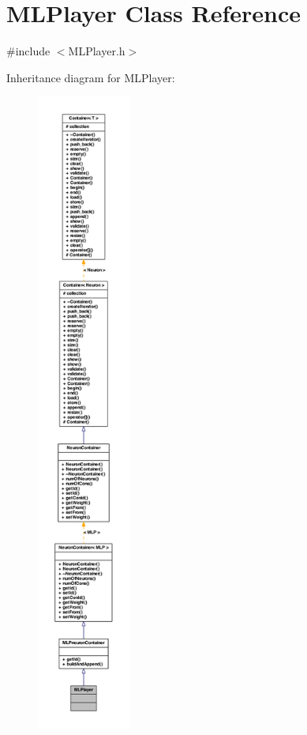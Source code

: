 \hypertarget{class_m_l_player}{
\section{MLPlayer Class Reference}
\label{class_m_l_player}
}


{\ttfamily \#include $<$MLPlayer.h$>$}



Inheritance diagram for MLPlayer:\nopagebreak
\begin{figure}[H]
\begin{center}
\leavevmode
\includegraphics[height=600pt]{class_m_l_player__inherit__graph}
\end{center}
\end{figure}


